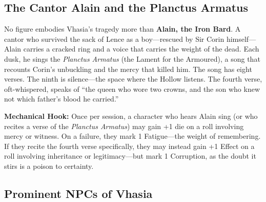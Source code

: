 \subsection*{The Cantor Alain and the Planctus Armatus}

No figure embodies Vhasia's tragedy more than \textbf{Alain, the Iron Bard}. A cantor who survived the sack of Lence as a boy---rescued by Sir Corin himself---Alain carries a cracked ring and a voice that carries the weight of the dead. Each dusk, he sings the \textit{Planctus Armatus} (the Lament for the Armoured), a song that recounts Corin's unbuckling and the mercy that killed him. The song has eight verses. The ninth is silence---the space where the Hollow listens. The fourth verse, oft-whispered, speaks of ``the queen who wore two crowns, and the son who knew not which father's blood he carried.''

\textbf{Mechanical Hook:} Once per session, a character who hears Alain sing (or who recites a verse of the \textit{Planctus Armatus}) may gain +1 die on a roll involving mercy or witness. On a failure, they mark 1 Fatigue---the weight of remembering. If they recite the fourth verse specifically, they may instead gain +1 Effect on a roll involving inheritance or legitimacy---but mark 1 Corruption, as the doubt it stirs is a poison to certainty.

\subsection*{Prominent NPCs of Vhasia}
\label{sec:vhasia-npcs}

